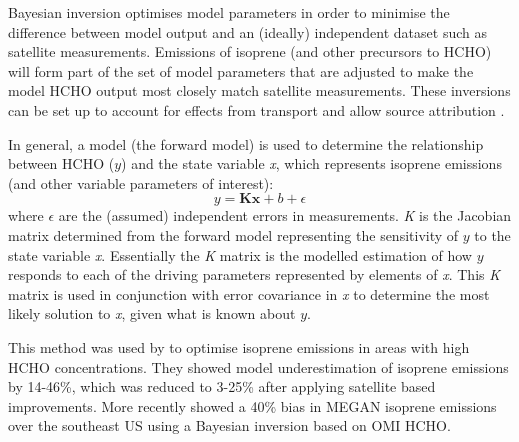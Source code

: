 \documentclass[acp, manuscript]{copernicus}
\newcommand{\parencite}{\citep}
\newcommand{\textcite}{\citet}
\begin{document}
Bayesian inversion optimises model parameters in order to minimise the difference between model output and an (ideally) independent dataset such as satellite measurements.
Emissions of isoprene (and other precursors to HCHO) will form part of the set of model parameters that are adjusted to make the model HCHO output most closely match satellite measurements.
These inversions can be set up to account for effects from transport and allow source attribution \parencite[e.g.,][]{Curci2010,FortemsCheiney2012}.

In general, a model (the forward model) is used to determine the relationship between HCHO ($y$) and the state variable \emph{x}, which represents isoprene emissions (and other variable parameters of interest):
\begin{equation}
\label{BioIsop:intro:top_down_estimates:eqn_bayesian}
y=\mathbf{Kx} + b + \epsilon
\end{equation}
where $\epsilon$ are the (assumed) independent errors in measurements.
\emph{K} is the Jacobian matrix determined from the forward model representing the sensitivity of $y$ to the state variable \emph{x}.
Essentially the \emph{K} matrix is the modelled estimation of how $y$ responds to each of the driving parameters represented by elements of \emph{x}.
This \emph{K} matrix is used in conjunction with error covariance in \emph{x} to determine the most likely solution to \emph{x}, given what is known about $y$. %

This method was used by \textcite{Shim2005} to optimise isoprene emissions in areas with high HCHO concentrations. 
They showed model underestimation of isoprene emissions by 14-46\%, which was reduced to 3-25\% after applying satellite based improvements.
More recently \textcite{Kaiser2018} showed a 40\% bias in MEGAN isoprene emissions over the southeast US using a Bayesian inversion based on OMI HCHO.
\end{document}
